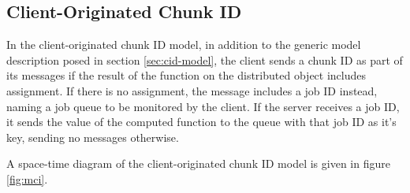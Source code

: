 \documentclass[a4paper,10pt]{article}
\begin{document}
\subsection{Client-Originated Chunk ID}

In the client-originated chunk ID  model, in addition to the generic model
description posed in section \ref{sec:cid-model}, the client sends a chunk ID
as part of its messages if the result of the function on the distributed object
includes assignment.
If there is no assignment, the message includes a job ID instead, naming a job
queue to be monitored by the client.
If the server receives a job ID, it sends the value of the computed function to
the queue with that job ID as it's key, sending no messages otherwise.

A space-time diagram of the client-originated chunk ID model is given in figure
\ref{fig:mci}.
\end{document}
